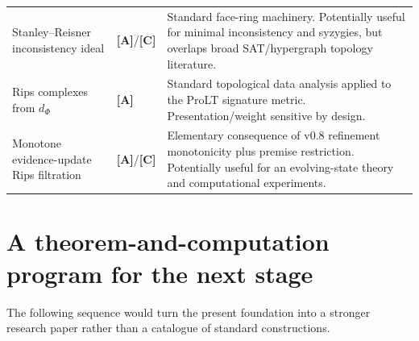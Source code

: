 \documentclass[11pt]{article}
\theoremstyle{definition}
\newcommand{\statusA}{\textbf{[A]}}
\newcommand{\statusC}{\textbf{[C]}}
\begin{document}
\begin{longtable}{>{\raggedright\arraybackslash}p{}>{\raggedright\arraybackslash}p{}>{\raggedright\arraybackslash}p{}}
Stanley--Reisner inconsistency ideal & \statusA/\statusC & Standard face-ring machinery. Potentially useful for minimal inconsistency and syzygies, but overlaps broad SAT/hypergraph topology literature. \\
Rips complexes from $d_\Phi$ & \statusA & Standard topological data analysis applied to the ProLT signature metric. Presentation/weight sensitive by design. \\
Monotone evidence-update Rips filtration & \statusA/\statusC & Elementary consequence of v0.8 refinement monotonicity plus premise restriction. Potentially useful for an evolving-state theory and computational experiments. \\
\bottomrule
\end{longtable}

\section{A theorem-and-computation program for the next stage}

The following sequence would turn the present foundation into a stronger research paper rather than a catalogue of standard constructions.
\end{document}
